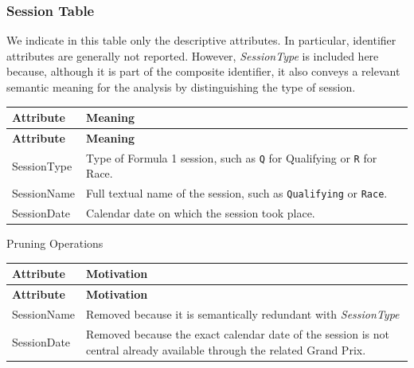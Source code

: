 \documentclass[a4paper,11pt]{article}
\begin{document}
	

	\subsubsection{Session Table}
	
	We indicate in this table only the descriptive attributes. In particular, identifier attributes are generally not reported. However, \textit{SessionType} is included here because, although it is part of the composite identifier, it also conveys a relevant semantic meaning for the analysis by distinguishing the type of session.
	
	\begin{longtable}{|p{4cm}|p{10.8cm}|}
		\hline
		\textbf{Attribute} & \textbf{Meaning} \\
		\hline
		\endfirsthead
		
		\hline
		\textbf{Attribute} & \textbf{Meaning} \\
		\hline
		\endhead
		
		SessionType & Type of Formula 1 session, such as \texttt{Q} for Qualifying or \texttt{R} for Race. \\ \hline
		
		SessionName & Full textual name of the session, such as \texttt{Qualifying} or \texttt{Race}. \\ \hline
		
		SessionDate & Calendar date on which the session took place. \\ \hline
		
	\end{longtable}
	
	Pruning Operations
	
	\begin{longtable}{|p{4.4cm}|p{10.8cm}|}
		\hline
		\textbf{Attribute} & \textbf{Motivation} \\
		\hline
		\endfirsthead
		
		\hline
		\textbf{Attribute} & \textbf{Motivation} \\
		\hline
		\endhead
		
		SessionName & Removed because it is semantically redundant with \textit{SessionType} \\ \hline
		
		SessionDate & Removed because the exact calendar date of the session is not central already available through the related Grand Prix. \\ \hline
		
	\end{longtable}
	
\end{document}
